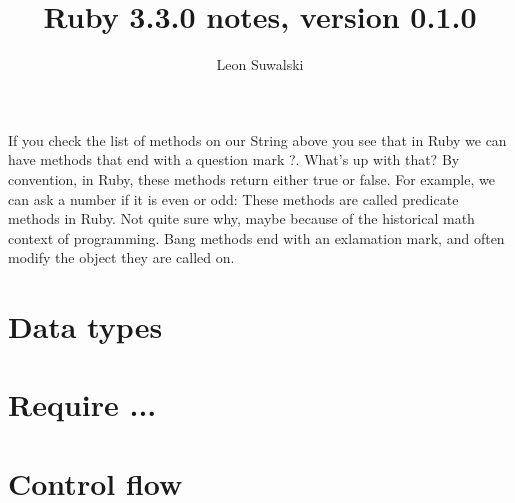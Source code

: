 \documentclass{a5charun}
\title{Ruby 3.3.0 notes, version 0.1.0}
\author{Leon Suwalski}
\begin{document}
\maketitle

If you check the list of methods on our String above you see that in Ruby we can have methods that end with a question mark ?. What’s up with that?
By convention, in Ruby, these methods return either true or false. For example, we can ask a number if it is even or odd:
These methods are called predicate methods in Ruby. Not quite sure why, maybe because of the historical math context of programming.
Bang methods end with an exlamation mark, and often modify the object they are called on. 


\section{Data types}







\section{Require ...}



\section{Control flow}


\end{document}
